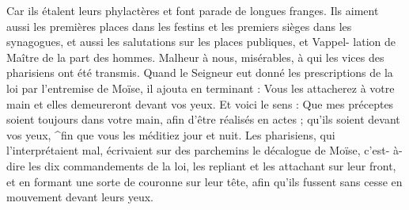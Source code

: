 Car ils étalent leurs phylactères et font parade de longues franges. Ils aiment aussi les premières places dans les festins et les premiers sièges dans les synagogues, et aussi les salutations sur les places publiques, et Vappel- lation de Maître de la part des hommes. Malheur à nous, misérables, à qui les vices des pharisiens ont été transmis. Quand le Seigneur eut donné les prescriptions de la loi par l’entremise de Moïse, il ajouta en terminant : Vous les attacherez à votre main et elles demeureront devant vos yeux. Et voici le sens : Que mes préceptes soient toujours dans votre main, afin d’être réalisés en actes ; qu’ils soient devant vos yeux, ^fin que vous les méditiez jour et nuit. Les pharisiens, qui l’interprétaient mal, écrivaient sur des parchemins le décalogue de Moïse, c’est- à-dire les dix commandements de la loi, les repliant et les attachant sur leur front, et en formant une sorte de couronne sur leur tête, afin qu’ils fussent sans cesse en mouvement devant leurs yeux.
